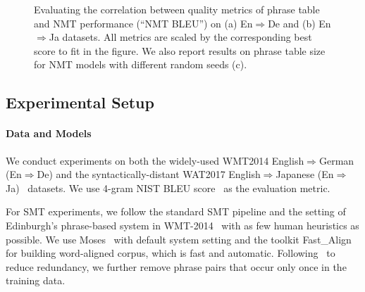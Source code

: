 \documentclass[11pt,a4paper]{article}
\begin{document}
\begin{figure}[t]
    \centering
     \hfill
    \hfill
\caption{Evaluating the correlation between quality metrics of phrase table and NMT performance (``NMT BLEU'') on (a) En$\Rightarrow$De and (b) En$\Rightarrow$Ja datasets. All metrics are scaled by the corresponding best score to fit in the figure. We also report results on phrase table size for NMT models with different random seeds (c). }
\label{fig:phrase_table}
\end{figure}


\subsection{Experimental Setup}
\label{section:setup}

\paragraph{Data and Models}
We conduct experiments on both the widely-used WMT2014 English$\Rightarrow$German (En$\Rightarrow$De) and the syntactically-distant WAT2017 English$\Rightarrow$Japanese (En$\Rightarrow$Ja)~\cite{neubig:2015:wat} datasets. We use 4-gram NIST BLEU score~\cite{papineni2002bleu} as the evaluation metric.

{For SMT experiments, we follow the standard SMT pipeline and the setting of Edinburgh’s phrase-based system in WMT-2014~\cite{durrani2014edinburgh} with as few human heuristics as possible.} 
We use Moses~\cite{koehn2007moses} with default system setting and the toolkit Fast\_Align~\cite{dyer:2013:naacl} for building word-aligned corpus, which is fast and automatic.
Following~ to reduce redundancy, we further remove phrase pairs that occur only once in the training data.
\end{document}
